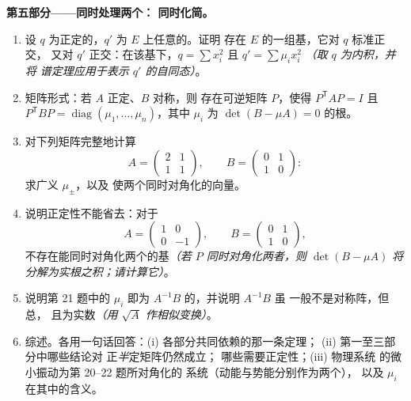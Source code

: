 \begin{problem}
\medskip
\noindent\textbf{第五部分——同时处理两个：
同时化简。}
\begin{enumerate}[resume]
  \item 设 $q$ 为正定的，$q'$ 为
        $E$ 上任意的。证明
        存在 $E$ 的一组基，它对 $q$ 标准正交，
        又对 $q'$ 正交：在该基下，$q = \sum x_i^2$ 且 $q' = \sum \mu_i
        x_i^2$ \emph{（取 $q$ 为内积，并将
        谱定理应用于表示
        $q'$ 的自同态）}。
  \item 矩阵形式：若 $A$ 正定、$B$ 对称，则
        存在可逆矩阵 $P$，使得
        $P^{\mathsf T}AP = I$ 且 $P^{\mathsf T}BP =
        \operatorname{diag}(\mu_1, \dots, \mu_n)$，其中
        $\mu_i$ 为 $\det(B - \mu A) = 0$ 的根。
  \item 对下列矩阵完整地计算
        \[
        A = \begin{pmatrix} 2 & 1\\ 1 & 1 \end{pmatrix},
        \qquad
        B = \begin{pmatrix} 0 & 1\\ 1 & 0 \end{pmatrix} :
        \]
        求广义 $\mu_\pm$，以及
        使两个同时对角化的向量。
  \item 说明正定性不能省去：对于
        \[
        A = \begin{pmatrix} 1 & 0\\ 0 & -1 \end{pmatrix},
        \qquad
        B = \begin{pmatrix} 0 & 1\\ 1 & 0 \end{pmatrix},
        \]
        不存在能同时对角化两个的基\emph{（若 $P$
        同时对角化两者，则 $\det(B - \mu A)$ 将
        分解为实根之积；请计算它）}。
  \item 说明第 21 题中的 $\mu_i$ 即为
        $A^{-1}B$ 的，并说明 $A^{-1}B$ 虽
        一般不是对称阵，但总，
        且为实数\emph{（用 $\sqrt A$ 作相似变换）}。
  \item 综述。各用一句话回答：(i) 各部分共同依赖的那一条定理；
        (ii) 第一至三部分中哪些结论对
        正\emph{半}定矩阵仍然成立；
        哪些需要正定性；(iii) 物理系统
        的微小振动为第 20--22 题所对角化的
        系统（动能与势能分别作为两个），
        以及 $\mu_i$ 在其中的含义。
\end{enumerate}
\end{problem}
